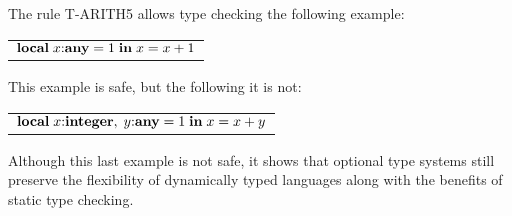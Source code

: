 The rule \textsc{T-ARITH5} allows type checking the following
example:
\begin{center}
\begin{tabular}{l}
$\mathbf{local} \; x{:}\mathbf{any} = 1 \; \mathbf{in} \; x = x + 1$
\end{tabular}
\end{center}

This example is safe, but the following it is not:
\begin{center}
\begin{tabular}{l}
$\mathbf{local} \; x{:}\mathbf{integer}, \;y{:}\mathbf{any} = 1 \; \mathbf{in} \; x = x + y$
\end{tabular}
\end{center}

Although this last example is not safe, it shows that optional
type systems still preserve the flexibility of dynamically
typed languages along with the benefits of static type checking.
